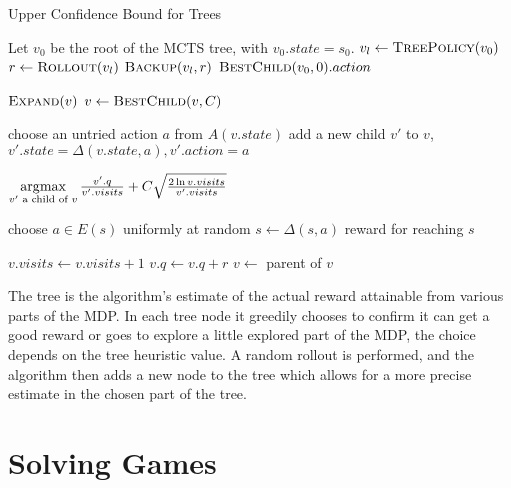 \begin{algorithm}
    \caption{Upper Confidence Bound for Trees}
\label{alg:uct}
\begin{algorithmic}
    \State Let $v_0$ be the root of the MCTS tree, with $v_0.state = s_0$.
        \State $v_l \gets \Call{TreePolicy}{v_0}$
        \State $r \gets \Call{Rollout}{v_l}$
        \State $\Call{Backup}{v_l, r}$
    \EndWhile
    \State \Return $\Call{BestChild}{v_0, 0}.action$
\EndFunction

            \State $\Call{Expand}{v}$
        \Else
            \State $v \gets \Call{BestChild}{v, C}$
        \EndIf
    \EndWhile
\EndFunction

    \State choose an untried action $a$ from $A(v.state)$
    \State add a new child $v'$ to $v$,
        $v'.state = \Delta(v.state, a),
        v'.action = a$
\EndFunction

    \State \Return
    $\operatorname*{\arg\!\max}\limits_{v' \text{ a child of } v}
    \frac{v'.q}{v'.visits} +
    C \sqrt{\frac{2\ln v.visits}{v'.visits}}$
\EndFunction

        \State choose $a \in E(s)$ uniformly at random
        \State $s \gets \Delta(s,a)$
    \EndWhile
    \Return reward for reaching $s$
\EndFunction

        \State $v.visits \gets v.visits + 1$
        \State $v.q \gets v.q + r$
        \State $v \gets$ parent of $v$
    \EndWhile
\EndFunction
\end{algorithmic}
\end{algorithm}

The tree is the algorithm's estimate of the actual reward attainable
from various parts of the MDP. In each tree node
it greedily chooses to confirm it can get a good reward or goes to explore
a little explored part of the MDP, the choice depends on the tree heuristic value.
A random rollout is performed, and the algorithm then adds a new node to
the tree which allows for a more precise estimate in the chosen part of
the tree.


\section{Solving Games}


